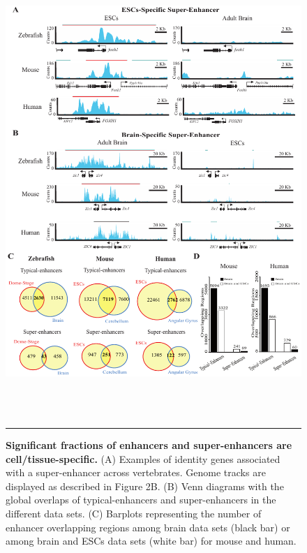 		\begin{figure}[!h]
			\centering
			\includegraphics[width=15cm,height=17cm]{./figures/Figure_4.pdf}
  			\caption[Specificity]{\textbf{Significant fractions of enhancers and super-enhancers are cell/tissue-specific.} (A) Examples of identity genes associated with a super-enhancer across vertebrates. Genome tracks are displayed as described in Figure 2B. (B) Venn diagrams with the global overlaps of typical-enhancers and super-enhancers in the different data sets. (C) Barplots representing the number of enhancer overlapping regions among brain data sets (black bar) or among brain and ESCs data sets (white bar) for mouse and human.}
			\label{Specificity}
			\rule{\textwidth}{0.25mm}
		\end{figure}

